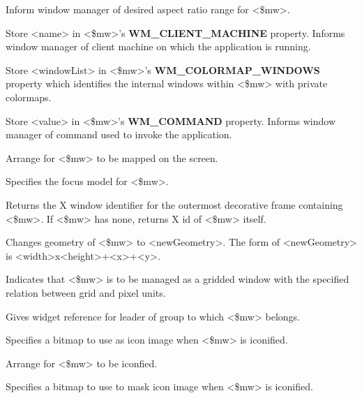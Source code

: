 \begin{enum}{1cm}

Inform window manager of desired aspect ratio range for <\$mw>.

Store <name> in <\$mw>'s {\bf WM\_CLIENT\_MACHINE} property. Informs
window manager of client machine on which the application is running.

Store <windowList> in <\$mw>'s {\bf WM\_COLORMAP\_WINDOWS} property
which identifies the internal windows within <\$mw> with private
colormaps.

Store <value> in <\$mw>'s {\bf WM\_COMMAND} property. Informs window manager
of command used to invoke the application.

Arrange for <\$mw> to be mapped on the screen.

Specifies the focus model for <\$mw>.

Returns the X window identifier for the outermost decorative frame
containing <\$mw>. If <\$mw> has none, returns X id of <\$mw> itself.

Changes geometry of <\$mw> to <newGeometry>.  The form of <newGeometry> is <width>x<height>+<x>+<y>.

Indicates that <\$mw> is to be managed as a gridded window with the
specified relation between grid and pixel units.

Gives widget reference for leader of group to which <\$mw> belongs.

Specifies a bitmap to use as icon image when <\$mw> is iconified.

Arrange for <\$mw> to be iconfied.

Specifies a bitmap to use to mask icon image when <\$mw> is iconified.


\end{enum}

